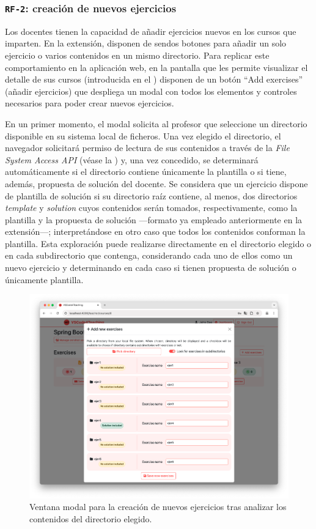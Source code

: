 \subsubsection{\texttt{RF-2}: creación de nuevos ejercicios}
\label{subsec:rf2}

Los docentes tienen la capacidad de añadir ejercicios nuevos en los cursos que imparten. En la extensión, disponen de sendos botones para añadir un solo ejercicio o varios contenidos en un mismo directorio. Para replicar este comportamiento en la aplicación web, en la pantalla que les permite visualizar el detalle de sus cursos (introducida en el ) disponen de un botón ``Add exercises'' (añadir ejercicios) que despliega un modal con todos los elementos y controles necesarios para poder crear nuevos ejercicios.

En un primer momento, el modal solicita al profesor que seleccione un directorio disponible en su sistema local de ficheros. Una vez elegido el directorio, el navegador solicitará permiso de lectura de sus contenidos a través de la \textit{File System Access API} (véase la ) y, una vez concedido, se determinará automáticamente si el directorio contiene únicamente la plantilla o si tiene, además, propuesta de solución del docente. Se considera que un ejercicio dispone de plantilla de solución si su directorio raíz contiene, al menos, dos directorios \textit{template} y \textit{solution} cuyos contenidos serán tomados, respectivamente, como la plantilla y la propuesta de solución ---formato ya empleado anteriormente en la extensión---; interpretándose en otro caso que todos los contenidos conforman la plantilla. Esta exploración puede realizarse directamente en el directorio elegido o en cada subdirectorio que contenga, considerando cada uno de ellos como un nuevo ejercicio y determinando en cada caso si tienen propuesta de solución o únicamente plantilla.

\begin{figure}[ht]
    \centering
    \includegraphics[width=\textwidth]{imagenes/utilizadas/4-3-implementacion/rf2-1.png}
    \caption{Ventana modal para la creación de nuevos ejercicios tras analizar los contenidos del directorio elegido.}
    \label{fig:reqf2-1}
\end{figure}

